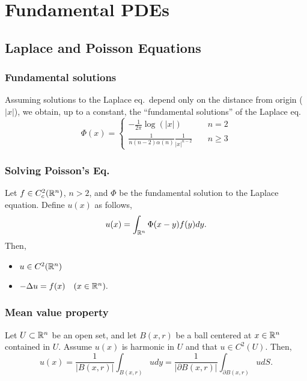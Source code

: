 \documentclass[oneside,a4paper,11pt]{report}
\begin{document}
\section{Fundamental PDEs}
\subsection{Laplace and Poisson Equations}
\subsubsection{Fundamental solutions}
Assuming solutions to the Laplace eq.\ depend only on the distance from origin ($|x|$), we obtain, up to a constant, the ``fundamental solutions'' of the Laplace eq.
\[ \Phi(x) =
  \begin{cases}
    -\frac{1}{2\pi} \log(|x|) & \quad n = 2\\
     \frac{1}{n(n-2)\alpha(n)} \frac{1}{|x|^{n-2}} & \quad n \ge 3
  \end{cases} \]
  
\subsubsection{Solving Poisson's Eq.} Let $f \in C_c^2({\mathbb{R}^n})$, $n > 2$, and $\Phi$ be the fundamental solution to the Laplace equation. Define $u(x)$ as follows,
\[u(x) = \int_{{\mathbb{R}^n}}\Phi(x-y)f(y)dy. \]
Then,
\begin{itemize}
\item $u \in C^2({\mathbb{R}^n})$
\item $-\Delta u = f(x) \quad (x \in {\mathbb{R}^n}).$
\end{itemize}

\subsubsection{Mean value property}
 Let $U \subset {\mathbb{R}^n}$ be an open set, and let $B(x,r)$ be a ball centered at $x \in {\mathbb{R}^n}$ contained in $U$. Assume $u(x)$ is harmonic in $U$ and that $u \in C^2(U)$. Then,
\[u(x) = \frac{1}{|B(x,r)|} \int_{B(x,r)} u dy = \frac{1}{|\partial B(x,r)|} \int_{\partial B(x,r)} u dS. \] 
\end{document}
